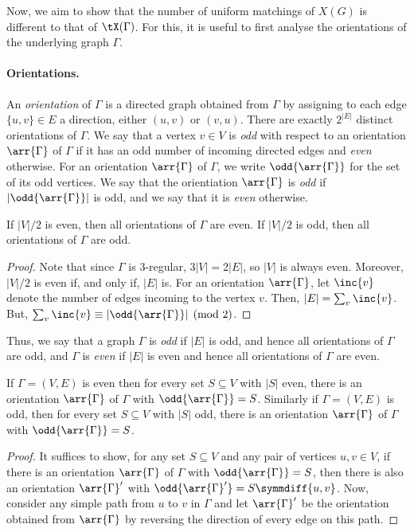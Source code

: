 \documentclass{toc}
\begin{document}
Now, we aim to show that the number of uniform matchings of $X(G)$ is different
to that of $\tX(\Gamma)$. For this, it is useful to first analyse the orientations of
the underlying graph $\Gamma$.

\paragraph{Orientations.}
An \emph{orientation} of $\Gamma$ is a directed graph obtained from $\Gamma$ by assigning
to each edge $\{u,v\} \in E$ a direction, either $(u,v)$ or $(v,u)$. There are
exactly $2^{|E|}$ distinct orientations of $\Gamma$. We say that a vertex $v \in V$
is \emph{odd} with respect to an orientation $\arr{\Gamma}$ of $\Gamma$ if it has an odd
number of incoming directed edges and \emph{even} otherwise. For an orientation
$\arr{\Gamma}$ of $\Gamma$, we write $\odd{\arr{\Gamma}}$ for the set of its odd vertices. We
say that the orientiation $\arr{\Gamma}$ is \emph{odd} if $|\odd{\arr{\Gamma}}|$ is odd,
and we say that
%
it is \emph{even} otherwise.

\begin{lemma}\label{lem:orientation-parity}
  If $|V|/2$ is even, then all orientations of $\Gamma$ are even. If $|V|/2$ is odd,
  then all orientations of $\Gamma$ are odd.
\end{lemma}
\begin{proof}
  Note that since $\Gamma$ is $3$-regular, $3|V| = 2|E|$, so $|V|$ is always even.
  Moreover, $|V|/2$ is even if, and only if, $|E|$ is. For an orientation
  $\arr{\Gamma}$, let $\inc{v}$ denote the number of edges incoming to the vertex
  $v$. Then, $|E| = \sum_v \inc{v}$. But, $\sum_v \inc{v} \equiv |\odd{\arr{\Gamma}}|
  \pmod 2$.
\end{proof}

Thus, we say that a graph $\Gamma$ is \emph{odd} if $|E|$ is odd, and hence all
orientations of $\Gamma$ are odd, and $\Gamma$ is \emph{even} if $|E|$ is even and hence
all orientations of $\Gamma$ are even.

\begin{lemma}\label{lem:transitive-parity}
  If $\Gamma = (V,E)$ is even then for every set $S \subseteq V$ with $|S|$ even,
  there is an orientation $\arr{\Gamma}$ of $\Gamma$ with $\odd{\arr{\Gamma}} = S$. Similarly
  if $\Gamma = (V,E)$ is odd, then for every set $S \subseteq V$ with $|S|$ odd,
  there is an orientation $\arr{\Gamma}$ of $\Gamma$ with $\odd{\arr{\Gamma}} = S$.
\end{lemma}
\begin{proof}
  It suffices to show, for any set $S \subseteq V$ and any pair of vertices $u,v
  \in V$, if there is an orientation $\arr{\Gamma}$ of $\Gamma$ with $\odd{\arr{\Gamma}} = S$,
  then there is also an orientation $\arr{\Gamma}'$ with $\odd{\arr{\Gamma}'} = S
  \symmdiff \{u,v\}$. Now, consider any simple path from $u$ to $v$ in $\Gamma$ and
  let $\arr{\Gamma}'$ be the orientation obtained from $\arr{\Gamma}$ by reversing the
  direction of every edge on this path.
\end{proof}
\end{document}
